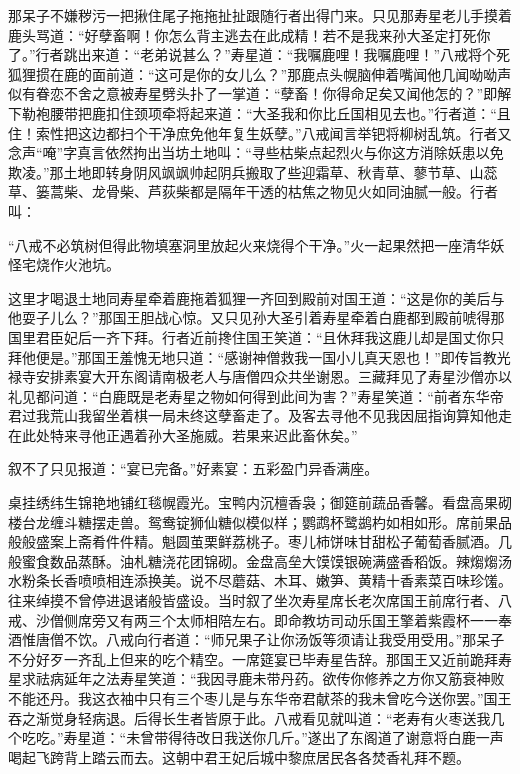\documentclass[12pt,UTF8]{ctexbook}
\begin{document}
{	那呆子不嫌秽污一把揪住尾子拖拖扯扯跟随行者出得门来。只见那寿星老儿手摸着鹿头骂道：“好孽畜啊！你怎么背主逃去在此成精！若不是我来孙大圣定打死你了。”行者跳出来道：“老弟说甚么？”寿星道：“我嘱鹿哩！我嘱鹿哩！”八戒将个死狐狸掼在鹿的面前道：“这可是你的女儿么？”那鹿点头幌脑伸着嘴闻他几闻呦呦声似有眷恋不舍之意被寿星劈头扑了一掌道：“孽畜！你得命足矣又闻他怎的？”即解下勒袍腰带把鹿扣住颈项牵将起来道：“大圣我和你比丘国相见去也。”行者道：“且住！索性把这边都扫个干净庶免他年复生妖孽。”八戒闻言举钯将柳树乱筑。行者又念声“唵”字真言依然拘出当坊土地叫：“寻些枯柴点起烈火与你这方消除妖患以免欺凌。”那土地即转身阴风飒飒帅起阴兵搬取了些迎霜草、秋青草、蓼节草、山蕊草、篓蒿柴、龙骨柴、芦荻柴都是隔年干透的枯焦之物见火如同油腻一般。行者叫：
	
	“八戒不必筑树但得此物填塞洞里放起火来烧得个干净。”火一起果然把一座清华妖怪宅烧作火池坑。
	
	这里才喝退土地同寿星牵着鹿拖着狐狸一齐回到殿前对国王道：“这是你的美后与他耍子儿么？”那国王胆战心惊。又只见孙大圣引着寿星牵着白鹿都到殿前唬得那国里君臣妃后一齐下拜。行者近前搀住国王笑道：“且休拜我这鹿儿却是国丈你只拜他便是。”那国王羞愧无地只道：“感谢神僧救我一国小儿真天恩也！”即传旨教光禄寺安排素宴大开东阁请南极老人与唐僧四众共坐谢恩。三藏拜见了寿星沙僧亦以礼见都问道：“白鹿既是老寿星之物如何得到此间为害？”寿星笑道：“前者东华帝君过我荒山我留坐着棋一局未终这孽畜走了。及客去寻他不见我因屈指询算知他走在此处特来寻他正遇着孙大圣施威。若果来迟此畜休矣。”
	
	叙不了只见报道：“宴已完备。”好素宴：五彩盈门异香满座。
	
	桌挂绣纬生锦艳地铺红毯幌霞光。宝鸭内沉檀香袅；御筵前蔬品香馨。看盘高果砌楼台龙缠斗糖摆走兽。鸳鸯锭狮仙糖似模似样；鹦鹉杯鹭鹚杓如相如形。席前果品般般盛案上斋肴件件精。魁圆茧栗鲜荔桃子。枣儿柿饼味甘甜松子葡萄香腻酒。几般蜜食数品蒸酥。油札糖浇花团锦砌。金盘高垒大馍馍银碗满盛香稻饭。辣煼煼汤水粉条长香喷喷相连添换美。说不尽蘑菇、木耳、嫩笋、黄精十香素菜百味珍馐。往来绰摸不曾停进退诸般皆盛设。当时叙了坐次寿星席长老次席国王前席行者、八戒、沙僧侧席旁又有两三个太师相陪左右。即命教坊司动乐国王擎着紫霞杯一一奉酒惟唐僧不饮。八戒向行者道：“师兄果子让你汤饭等须请让我受用受用。”那呆子不分好歹一齐乱上但来的吃个精空。一席筵宴已毕寿星告辞。那国王又近前跪拜寿星求祛病延年之法寿星笑道：“我因寻鹿未带丹药。欲传你修养之方你又筋衰神败不能还丹。我这衣袖中只有三个枣儿是与东华帝君献茶的我未曾吃今送你罢。”国王吞之渐觉身轻病退。后得长生者皆原于此。八戒看见就叫道：“老寿有火枣送我几个吃吃。”寿星道：“未曾带得待改日我送你几斤。”遂出了东阁道了谢意将白鹿一声喝起飞跨背上踏云而去。这朝中君王妃后城中黎庶居民各各焚香礼拜不题。
	
}
\end{document}
